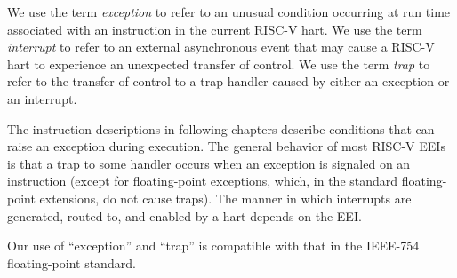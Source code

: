 We use the term {\em exception} to refer to an unusual condition
occurring at run time associated with an instruction in the current
RISC-V hart.  We use the term {\em interrupt} to refer to an external
asynchronous event that may cause a RISC-V hart to experience an
unexpected transfer of control.  We use the term {\em trap} to refer
to the transfer of control to a trap handler caused by either an
exception or an interrupt.

The instruction descriptions in following chapters describe conditions
that can raise an exception during execution.  The general behavior of
most RISC-V EEIs is that a trap to some handler occurs when an
exception is signaled on an instruction (except for floating-point
exceptions, which, in the standard floating-point extensions, do not
cause traps).  The manner in which interrupts are generated, routed
to, and enabled by a hart depends on the EEI.

\begin{commentary}
Our use of ``exception'' and ``trap'' is compatible with that in the IEEE-754
floating-point standard.
\end{commentary}

